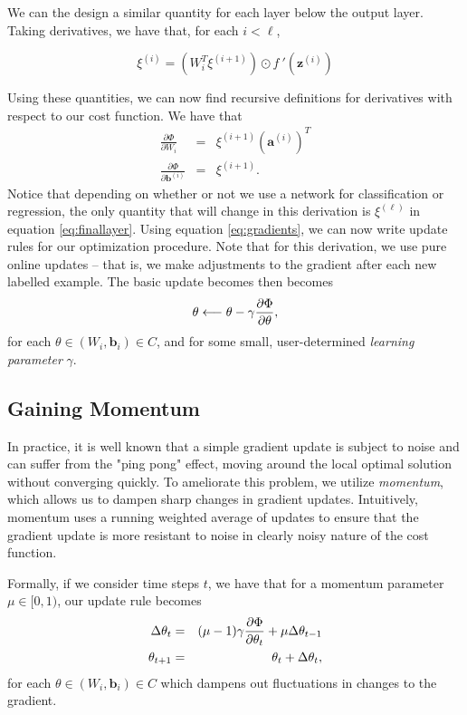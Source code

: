 We can the design a similar quantity for each layer below the output layer. Taking derivatives, we have that, for each $i< \ell$,

\begin{equation}
\label{update1}
\xi^{(i)} = (W_i^T\xi^{(i+1)})\odot f\:'(\mathbf{z}^{(i)})
\end{equation}

Using these quantities, we can now find recursive definitions for derivatives with respect to our cost function. We have that 
\begin{eqnarray}
\label{eq:gradients}
\frac{\partial\Phi}{\partial W_i} &=& \xi^{(i+1)}(\mathbf{a}^{(i)})^T\\
\frac{\partial\Phi}{\partial \mathbf{b}^{(i)}} &=& \xi^{(i+1)}.
\end{eqnarray}
Notice that depending on whether or not we use a network for classification or regression, the only quantity that will change in this derivation is $\xi^{(\ell)}$ in equation \eqref{eq:finallayer}. Using equation \eqref{eq:gradients}, we can now write update rules for our optimization procedure. Note that for this derivation, we use pure online updates -- that is, we make adjustments to the gradient after each new labelled example. The basic update becomes then becomes
\begin{equation}
\theta \longleftarrow \theta - \gamma \frac{\partial \Phi}{\partial \theta},
\end{equation}
for each $\theta\in(W_i, \mathbf{b}_i)\in C$, and for some small, user-determined \emph{learning parameter} $\gamma$.

\subsection{Gaining Momentum}

In practice, it is well known that a simple gradient update is subject to noise and can suffer from the "ping pong" effect, moving around the local optimal solution without converging quickly. To ameliorate this problem, we utilize \emph{momentum}, which allows us to dampen sharp changes in gradient 
updates. Intuitively, momentum uses a running weighted average of updates to ensure that the gradient update is more resistant to noise in clearly noisy nature of the cost function. 

Formally, if we consider time steps $t$, we have that for a momentum parameter $\mu\in[0,1)$, our update rule becomes 
\begin{eqnarray}
\label{eq:updaterule}
\Delta\theta_{t} &=& (\mu - 1)\gamma\frac{\partial \Phi}{\partial \theta_t} + \mu\Delta\theta_{t - 1}\\
\theta_{t+1} &=& \theta_t + \Delta\theta_{t},
\end{eqnarray}
for each $\theta\in(W_i, \mathbf{b}_i)\in C$ which dampens out fluctuations in changes to the gradient.



